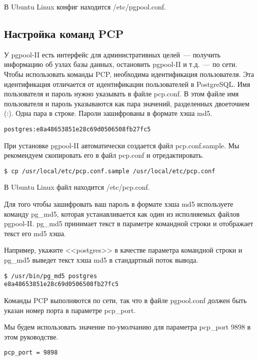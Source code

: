 В Ubuntu Linux конфиг находится /etc/pgpool.conf.

\subsection{Настройка команд PCP}
У pgpool-II есть интерфейс для административных целей~--- получить информацию об узлах базы данных, 
остановить pgpool-II и т.д.~--- по сети. Чтобы использовать команды PCP, необходима идентификация пользователя. 
Эта идентификация отличается от идентификации пользователей в PostgreSQL. Имя пользователя и пароль нужно указывать в 
файле pcp.conf. В этом файле имя пользователя и пароль указываются как пара значений, разделенных двоеточием (:). 
Одна пара в строке. Пароли зашифрованы в формате хэша md5.
\begin{lstlisting}[label=lst:pgpool6,caption=Настройка команд PCP]
postgres:e8a48653851e28c69d0506508fb27fc5
\end{lstlisting}

При установке pgpool-II автоматически создается файл pcp.conf.sample. 
Мы рекомендуем скопировать его в файл pcp.conf и отредактировать.
\begin{lstlisting}[label=lst:pgpool7,caption=Настройка команд PCP]
$ cp /usr/local/etc/pcp.conf.sample /usr/local/etc/pcp.conf
\end{lstlisting}

В Ubuntu Linux файл находится /etc/pcp.conf.

Для того чтобы зашифровать ваш пароль в формате хэша md5 используете команду pg\_md5, которая устанавливается как один из 
исполняемых файлов pgpool-II. pg\_md5 принимает текст в параметре командной строки и отображает текст его md5 хэша.

Например, укажите <<postgres>> в качестве параметра командной строки и pg\_md5 выведет текст хэша md5 в стандартный поток вывода.
\begin{lstlisting}[label=lst:pgpool8,caption=Настройка команд PCP]
$ /usr/bin/pg_md5 postgres
e8a48653851e28c69d0506508fb27fc5
\end{lstlisting}

Команды PCP выполняются по сети, так что в файле pgpool.conf должен быть указан номер порта в параметре pcp\_port.

Мы будем использовать значение по-умолчанию для параметра pcp\_port 9898 в этом руководстве.
\begin{lstlisting}[label=lst:pgpool9,caption=Настройка команд PCP]
pcp_port = 9898
\end{lstlisting}


